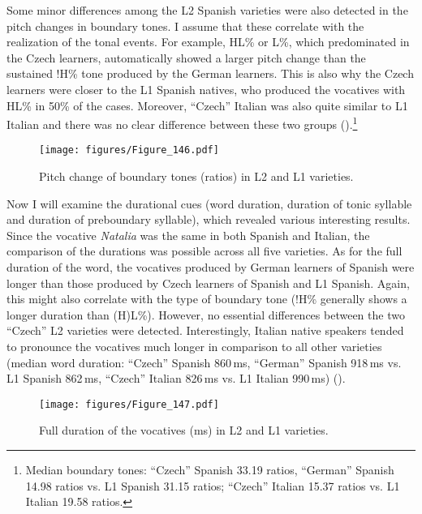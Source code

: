 Some minor differences among the L2 Spanish varieties were also detected in the pitch changes in boundary tones. I assume that these correlate with the realization of the tonal events. For example, HL\% or L\%, which predominated in the Czech learners, automatically showed a larger pitch change than the sustained !H\% tone produced by the German learners. This is also why the Czech learners were closer to the L1 Spanish natives, who produced the vocatives with HL\% in 50\% of the cases. Moreover, “Czech” Italian was also quite similar to L1 Italian and there was no clear difference between these two groups ().\footnote{Median boundary tones: “Czech” Spanish 33.19 ratios, “German” Spanish 14.98 ratios vs. L1 Spanish 31.15 ratios; “Czech” Italian 15.37 ratios vs. L1 Italian 19.58 ratios.}

\begin{figure}


\texttt{[image: figures/Figure\_146.pdf]}



\caption{Pitch change of boundary tones (ratios) in L2 and L1 varieties.}
\label{fig:4.146}
\end{figure}


Now I will examine the durational cues (word duration, duration of tonic syllable and duration of preboundary syllable), which revealed various interesting results. Since the vocative \textit{Natalia} was the same in both Spanish and Italian, the comparison of the durations was possible across all five varieties. As for the full duration of the word, the vocatives produced by German learners of Spanish were longer than those produced by Czech learners of Spanish and L1 Spanish. Again, this might also correlate with the type of boundary tone (!H\% generally shows a longer duration than (H)L\%). However, no essential differences between the two “Czech” L2 varieties were detected. Interestingly, Italian native speakers tended to pronounce the vocatives much longer in comparison to all other varieties (median word duration: “Czech” Spanish 860\,ms, “German” Spanish 918\,ms vs. L1 Spanish 862\,ms, “Czech” Italian 826\,ms vs. L1 Italian 990\,ms) ().


\begin{figure}


\texttt{[image: figures/Figure\_147.pdf]}



\caption{Full duration of the vocatives (ms) in L2 and L1 varieties.}
\label{fig:4.147}
\end{figure}

